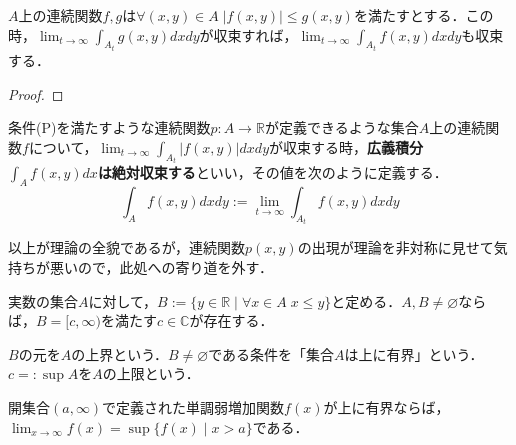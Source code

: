 \documentclass[uplatex, dvipdfmx]{jsreport}
\begin{document}
\begin{proposition}[優級数による広義積分の収束判定]
    $A$上の連続関数$f,g$は$\forall (x,y)\in A\; |f(x,y)|\le g(x,y)$を満たすとする．この時，$\lim_{t\to\infty}\int_{A_t}g(x,y)dxdy$が収束すれば，$\lim_{t\to\infty}\int_{A_t}f(x,y)dxdy$も収束する．
\end{proposition}
\begin{proof}
    
\end{proof}

\begin{definition}[広義積分の絶対収束]
    条件(P)を満たすような連続関数$p:A\to\mathbb{R}$が定義できるような集合$A$上の連続関数$f$について，$\lim_{t\to\infty}\int_{A_t}|f(x,y)|dxdy$が収束する時，\textbf{広義積分$\int_Af(x,y)dx$は絶対収束する}といい，その値を次のように定義する．
    \[ \int_Af(x,y)dxdy := \lim_{t\to\infty}\int_{A_t}f(x,y)dxdy \]
\end{definition}
以上が理論の全貌であるが，連続関数$p(x,y)$の出現が理論を非対称に見せて気持ちが悪いので，此処への寄り道を外す．

\begin{proposition}
    実数の集合$A$に対して，$B:=\{y\in\mathbb{R}\mid\forall x\in A\; x\le y\}$と定める．$A,B\ne\varnothing$ならば，$B=[c,\infty)$を満たす$c\in\mathbb{C}$が存在する．
\end{proposition}
\begin{definition}
    $B$の元を$A$の上界という．$B\ne\varnothing$である条件を「集合$A$は上に有界」という．$c=:\sup A$を$A$の上限という．
\end{definition}
\begin{corollary}
    開集合$(a,\infty)$で定義された単調弱増加関数$f(x)$が上に有界ならば，$\lim_{x\to\infty}f(x)=\sup\{f(x)\mid x>a\}$である．
\end{corollary}
\end{document}
